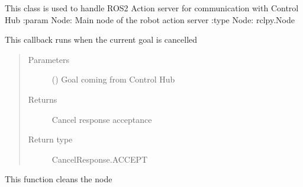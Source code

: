 \documentclass[letterpaper,10pt,english]{sphinxmanual}
\begin{document}
\begin{fulllineitems}
\label{\detokenize{index:Test_Robot.test_robot.test_robot.test_robot_server.GPIOActionServer}}
This class is used to handle ROS2 Action server for
communication with Control Hub 
:param Node: Main node of the robot action server  
:type Node: rclpy.Node

\begin{fulllineitems}
\label{\detokenize{index:Test_Robot.test_robot.test_robot.test_robot_server.GPIOActionServer.cancel_callback}}
This callback runs when the current goal is cancelled
\begin{quote}\begin{description}
\item[{Parameters}] \leavevmode
{} () \textendash{} Goal coming from Control Hub

\item[{Returns}] \leavevmode
Cancel response acceptance

\item[{Return type}] \leavevmode
CancelResponse.ACCEPT

\end{description}\end{quote}

\end{fulllineitems}


\begin{fulllineitems}
\label{\detokenize{index:Test_Robot.test_robot.test_robot.test_robot_server.GPIOActionServer.destroy}}
This function cleans the node

\end{fulllineitems}


\end{fulllineitems}
\end{document}
